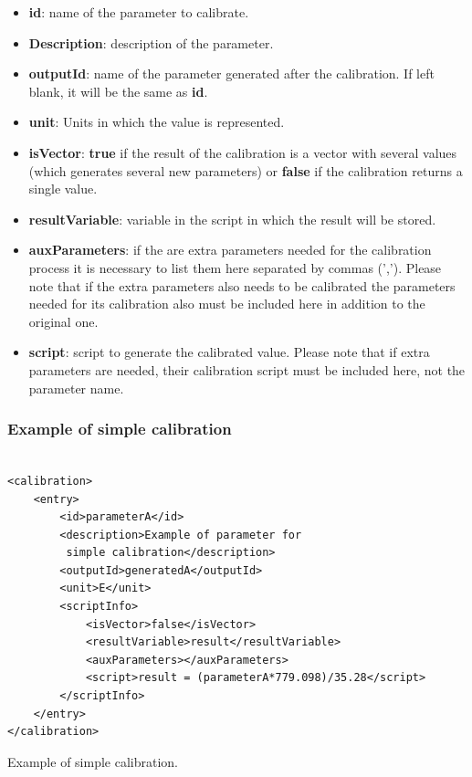 \begin{itemize}
\item \textbf{id}: name of the parameter to calibrate.
\item \textbf{Description}: description of the parameter.
\item \textbf{outputId}: name of the parameter generated after the calibration. If left blank, it will be the same as \textbf{id}.
\item \textbf{unit}: Units in which the value is represented.
\item \textbf{isVector}: \textbf{true} if the result of the calibration is a vector with several values (which generates several new parameters) or \textbf{false} if the calibration returns a single value.
\item \textbf{resultVariable}: variable in the script in which the result will be stored.
\item \textbf{auxParameters}: if the are extra parameters needed for the calibration process it is necessary to list them here separated by commas (','). Please note that if the extra parameters also needs to be calibrated the parameters needed for its calibration also must be included here in addition to the original one.
\item \textbf{script}: script to generate the calibrated value. Please note that if extra parameters are needed, their calibration script must be included here, not the parameter name. 
\end{itemize}

\subsubsection{Example of simple calibration}

\begin{table}[H]
\lstset{language=XML}
\begin{lstlisting}

<calibration>
	<entry>
		<id>parameterA</id>
		<description>Example of parameter for
		 simple calibration</description>
		<outputId>generatedA</outputId> 
		<unit>E</unit>
		<scriptInfo>
			<isVector>false</isVector>
			<resultVariable>result</resultVariable>
			<auxParameters></auxParameters>
			<script>result = (parameterA*779.098)/35.28</script>
		</scriptInfo>
	</entry>
</calibration>
\end{lstlisting}
\caption{Example of simple calibration.}
\label{Table5.7}
\end{table}

